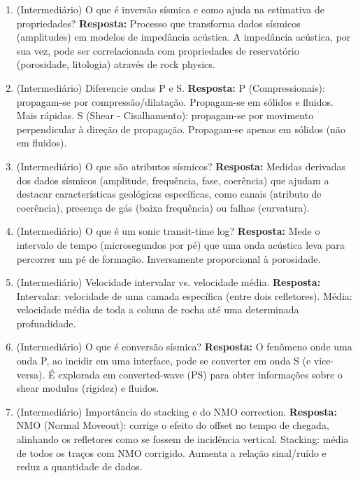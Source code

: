\documentclass[11pt,a4paper]{article}
\begin{document}
\begin{enumerate}
  \item (Intermediário) O que é inversão sísmica e como ajuda na estimativa de propriedades?
  \textbf{Resposta:} Processo que transforma dados sísmicos (amplitudes) em modelos de impedância acústica. A impedância acústica, por sua vez, pode ser correlacionada com propriedades de reservatório (porosidade, litologia) através de rock physics.

  \item (Intermediário) Diferencie ondas P e S.
  \textbf{Resposta:} P (Compressionais): propagam-se por compressão/dilatação. Propagam-se em sólidos e fluidos. Mais rápidas. S (Shear - Cisalhamento): propagam-se por movimento perpendicular à direção de propagação. Propagam-se apenas em sólidos (não em fluidos).

  \item (Intermediário) O que são atributos sísmicos?
  \textbf{Resposta:} Medidas derivadas dos dados sísmicos (amplitude, frequência, fase, coerência) que ajudam a destacar características geológicas específicas, como canais (atributo de coerência), presença de gás (baixa frequência) ou falhas (curvatura).

  \item (Intermediário) O que é um sonic transit-time log?
  \textbf{Resposta:} Mede o intervalo de tempo (microsegundos por pé) que uma onda acústica leva para percorrer um pé de formação. Inversamente proporcional à porosidade.

  \item (Intermediário) Velocidade intervalar vs. velocidade média.
  \textbf{Resposta:} Intervalar: velocidade de uma camada específica (entre dois refletores). Média: velocidade média de toda a coluna de rocha até uma determinada profundidade.

  \item (Intermediário) O que é conversão sísmica?
  \textbf{Resposta:} O fenômeno onde uma onda P, ao incidir em uma interface, pode se converter em onda S (e vice-versa). É explorada em converted-wave (PS) para obter informações sobre o shear modulus (rigidez) e fluidos.

  \item (Intermediário) Importância do stacking e do NMO correction.
  \textbf{Resposta:} NMO (Normal Moveout): corrige o efeito do offset no tempo de chegada, alinhando os refletores como se fossem de incidência vertical. Stacking: média de todos os traços com NMO corrigido. Aumenta a relação sinal/ruído e reduz a quantidade de dados.


\end{enumerate}
\end{document}
